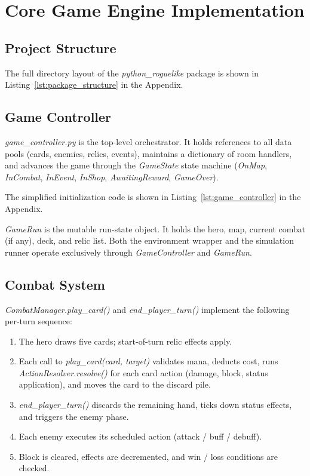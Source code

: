 \section{Core Game Engine Implementation}

\subsection{Project Structure}

The full directory layout of the \textit{python\_roguelike} package is shown in Listing~\ref{lst:package_structure} in the Appendix.

\subsection{Game Controller}

\begin{sloppypar}
\textit{game\_controller.py} is the top-level orchestrator. It holds references to all data pools (cards, enemies, relics, events), maintains a dictionary of room handlers, and advances the game through the \textit{GameState} state machine (\textit{OnMap}, \textit{InCombat}, \textit{InEvent}, \textit{InShop}, \textit{AwaitingReward}, \textit{GameOver}).
\end{sloppypar}

The simplified initialization code is shown in Listing~\ref{lst:game_controller} in the Appendix.

\textit{GameRun} is the mutable run-state object. It holds the hero, map, current combat (if any), deck, and relic list. Both the environment wrapper and the simulation runner operate exclusively through \textit{GameController} and \textit{GameRun}.

\subsection{Combat System}

\textit{CombatManager.play\_card()} and \textit{end\_player\_turn()} implement the following per-turn sequence:

\begin{enumerate}
    \item The hero draws five cards; start-of-turn relic effects apply.
    \item Each call to \textit{play\_card(card, target)} validates mana, deducts cost, runs \textit{ActionResolver.\allowbreak{}resolve()} for each card action (damage, block, status application), and moves the card to the discard pile.
    \item \textit{end\_player\_turn()} discards the remaining hand, ticks down status effects, and triggers the enemy phase.
    \item Each enemy executes its scheduled action (attack / buff / debuff).
    \item Block is cleared, effects are decremented, and win / loss conditions are checked.
\end{enumerate}

